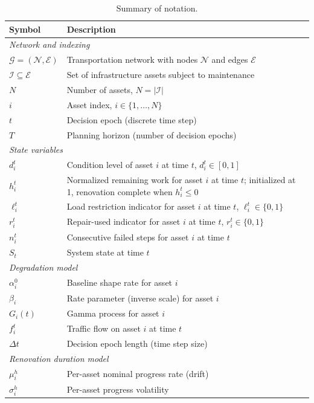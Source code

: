\documentclass[3p, twocolumn]{elsarticle}
\begin{document}
\begin{table}[htpb]
\centering
\caption{Summary of notation.}
\label{tab:notation}
\small
\begin{tabular}{ll}
\hline
\textbf{Symbol} & \textbf{Description} \\
\hline
\multicolumn{2}{l}{\textit{Network and indexing}} \\
$\mathcal{G} = (\mathcal{N}, \mathcal{E})$ & Transportation network with nodes $\mathcal{N}$ and edges $\mathcal{E}$ \\
$\mathcal{I} \subseteq \mathcal{E}$ & Set of infrastructure assets subject to maintenance \\
$N$ & Number of assets, $N = |\mathcal{I}|$ \\
$i$ & Asset index, $i \in \{1, \ldots, N\}$ \\
$t$ & Decision epoch (discrete time step) \\
$T$ & Planning horizon (number of decision epochs) \\
\hline
\multicolumn{2}{l}{\textit{State variables}} \\
$d_i^t$ & Condition level of asset $i$ at time $t$, $d_i^t \in [0, 1]$ \\
$h_i^t$ & Normalized remaining work for asset $i$ at time $t$; initialized at 1, renovation complete when $h_i^t \leq 0$ \\
$\ell_i^t$ & Load restriction indicator for asset $i$ at time $t$, $\ell_i^t \in \{0, 1\}$ \\
$r_i^t$ & Repair-used indicator for asset $i$ at time $t$, $r_i^t \in \{0, 1\}$ \\
$n_i^t$ & Consecutive failed steps for asset $i$ at time $t$ \\
$S_t$ & System state at time $t$ \\
\hline
\multicolumn{2}{l}{\textit{Degradation model}} \\
$\alpha_i^0$ & Baseline shape rate for asset $i$ \\
$\beta_i$ & Rate parameter (inverse scale) for asset $i$ \\
$G_i(t)$ & Gamma process for asset $i$ \\
$f_i^t$ & Traffic flow on asset $i$ at time $t$ \\
$\Delta t$ & Decision epoch length (time step size) \\
\hline
\multicolumn{2}{l}{\textit{Renovation duration model}} \\
$\mu_i^h$ & Per-asset nominal progress rate (drift) \\
$\sigma_i^h$ & Per-asset progress volatility \\

\end{tabular}
\end{table}
\end{document}
